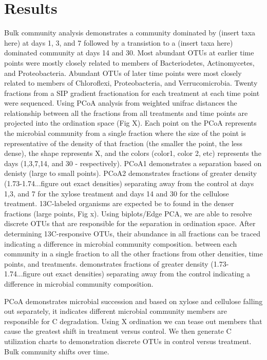 \section{Results}

Bulk community analysis demonstrates a community dominated by (insert taxa here) at days 1, 3, and 7 followed by a transistion to a (insert taxa here) dominated community at days 14 and 30. Most abundant OTUs at earlier time points were mostly closely related to members of Bacteriodetes, Actinomycetes, and Proteobacteria. Abundant OTUs of later time points were most closely related to members of Chloroflexi, Proteobacteria, and Verrucomicrobia. Twenty fractions from a SIP gradient fractionation for each treatment at each time point were sequenced. Using PCoA analysis from weighted unifrac distances the relationship between all the fractions from all treatments and time points are projected into the ordination space (Fig X). Each point on the PCoA represents the microbial community from a single fraction where the size of the point is representative of the density of that fraction (the smaller the point, the less dense), the shape represents X, and the colors (color1, color 2, etc) represents the days (1,3,7,14, and 30 - respectively). PCoA1 demonstrates a separation based on denisty (large to small points). PCoA2 demonstrates fractions of greater density (1.73-1.74...figure out exact densities) separating away from the control at days 1,3, and 7 for the xylose treatment and days 14 and 30 for the cellulose treatment. 13C-labeled organisms are expected be to found in the denser fractions (large points, Fig x). Using biplots/Edge PCA, we are able to resolve discrete OTUs that are responsible for the separation in ordination space. After determining 13C-responsive OTUs, their abundance in all fractions can be traced    indicating a difference in microbial community composition. 
between each community in a single fraction to all the other fractions from other densities, time points, and treatments.  
demonstrates fractions of greater density (1.73-1.74...figure out exact densities) separating away from the control indicating a difference in microbial community composition.          

PCoA demonstrates microbial succession and based on xylose and cellulose falling out separately, it indicates different microbial community members are responsible for C degradation.  Using X ordination we can tease out members that cause the greatest shift in treatment versus control.  We then generate C utilization charts to demonstration discrete OTUs in control versus treatment.  Bulk community shifts over time.  